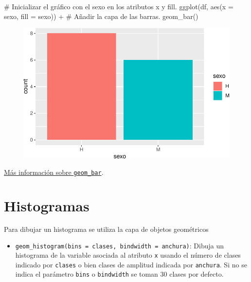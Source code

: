 \documentclass[
  a4paper,
]{scrreport}
\newenvironment{Shaded}{\begin{snugshade}}{\end{snugshade}}
\newcommand{\AttributeTok}[1]{\textcolor[rgb]{0.40,0.45,0.13}{#1}}
\newcommand{\CommentTok}[1]{\textcolor[rgb]{0.37,0.37,0.37}{#1}}
\newcommand{\FunctionTok}[1]{\textcolor[rgb]{0.28,0.35,0.67}{#1}}
\newcommand{\NormalTok}[1]{\textcolor[rgb]{0.00,0.23,0.31}{#1}}
\newcommand{\SpecialCharTok}[1]{\textcolor[rgb]{0.37,0.37,0.37}{#1}}
\providecommand{\tightlist}{%
  \setlength{\itemsep}{0pt}\setlength{\parskip}{0pt}}\usepackage{longtable,booktabs,array}
\theoremstyle{definition}
\theoremstyle{definition}
\theoremstyle{remark}
\begin{document}
\begin{Shaded}
\begin{Highlighting}[]
\CommentTok{\# Inicializar el gráfico con el sexo en los atributos x y fill.}
\FunctionTok{ggplot}\NormalTok{(df, }\FunctionTok{aes}\NormalTok{(}\AttributeTok{x =}\NormalTok{ sexo, }\AttributeTok{fill =}\NormalTok{ sexo)) }\SpecialCharTok{+}
\CommentTok{\# Añadir la capa de las barras.}
    \FunctionTok{geom\_bar}\NormalTok{() }
\end{Highlighting}
\end{Shaded}

\begin{figure}[H]

{\centering \includegraphics{./07-graficos_files/figure-pdf/unnamed-chunk-14-1.pdf}

}

\end{figure}

\href{https://ggplot2.tidyverse.org/reference/geom_bar.html}{Más
información sobre \texttt{geom\_bar}}.

\hypertarget{histogramas}{%
\section{Histogramas}\label{histogramas}}

Para dibujar un histograma se utiliza la capa de objetos geométricos

\begin{itemize}
\tightlist
\item
  \texttt{geom\_histogram(bins\ =\ clases,\ bindwidth\ =\ anchura)}:
  Dibuja un histograma de la variable asociada al atributo \texttt{x}
  usando el número de clases indicado por \texttt{clases} o bien clases
  de amplitud indicada por \texttt{anchura}. Si no se indica el
  parámetro \texttt{bins} o \texttt{bindwidth} se toman 30 clases por
  defecto.
\end{itemize}
\end{document}
